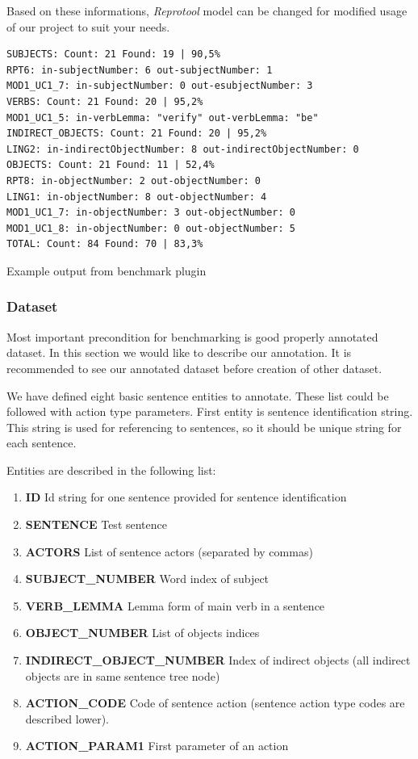 Based on these informations, \emph{Reprotool} model can be changed for modified usage of our project to suit your needs.

\begin{table}[ht]   %
\begin{center}
    \begin{verbatim}
SUBJECTS: Count: 21 Found: 19 | 90,5%
RPT6: in-subjectNumber: 6 out-subjectNumber: 1
MOD1_UC1_7: in-subjectNumber: 0 out-esubjectNumber: 3
VERBS: Count: 21 Found: 20 | 95,2%
MOD1_UC1_5: in-verbLemma: "verify" out-verbLemma: "be"
INDIRECT_OBJECTS: Count: 21 Found: 20 | 95,2%
LING2: in-indirectObjectNumber: 8 out-indirectObjectNumber: 0
OBJECTS: Count: 21 Found: 11 | 52,4%
RPT8: in-objectNumber: 2 out-objectNumber: 0
LING1: in-objectNumber: 8 out-objectNumber: 4
MOD1_UC1_7: in-objectNumber: 3 out-objectNumber: 0
MOD1_UC1_8: in-objectNumber: 0 out-objectNumber: 5
TOTAL: Count: 84 Found: 70 | 83,3%   
    \end{verbatim}
  \caption{Example output from benchmark plugin}
  \label{tab.benchmarkexample}
\end{center}
\end{table}   
      
      
\subsubsection{Dataset}
\label{sec:dataset}
Most important precondition for benchmarking is good properly annotated dataset. In this section we would like to describe our annotation. It is recommended to see our annotated dataset before creation of other dataset.

We have defined eight basic sentence entities to annotate. These list could be followed with action type parameters. First entity is sentence identification string. This string is used for referencing to sentences, so it should be unique string for each sentence.

Entities are described in the following list:

\begin{enumerate}
\item {\bf ID } Id string for one sentence provided for sentence identification
\item {\bf SENTENCE } Test sentence
\item {\bf ACTORS } List of sentence actors (separated by commas)
\item {\bf SUBJECT\_NUMBER } Word index of subject
\item {\bf VERB\_LEMMA } Lemma form of main verb in a sentence
\item {\bf OBJECT\_NUMBER} List of objects indices
\item {\bf INDIRECT\_OBJECT\_NUMBER} Index of indirect objects (all indirect objects are in same sentence tree node)
\item {\bf ACTION\_CODE} Code of sentence action (sentence action type codes are described lower). 
\item {\bf ACTION\_PARAM1} First parameter of an action
\end{enumerate}   
   
